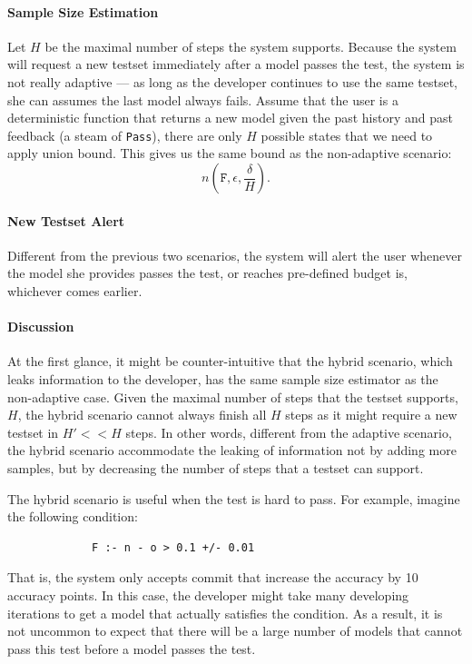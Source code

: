 \documentclass{article}
\begin{document}
\paragraph*{Sample Size Estimation}
Let $H$ be the maximal
number of steps the system supports.
Because the system will request a new testset
immediately after a model passes the test, the
system is not really adaptive --- as long as the 
developer continues to use the same testset, she
can assumes the last model always fails. Assume
that the user is a deterministic function that
returns a new model given the past history and 
past feedback (a steam of \texttt{Pass}), there are
only $H$ possible states that we need to apply
union bound. This gives us the same bound as 
the non-adaptive scenario:
\[
n(\texttt{F}, \epsilon, \frac{\delta}{H}).
\]

\paragraph*{New Testset Alert} Different from the
previous two scenarios, the system will alert
the user whenever the model she provides passes
the test, or reaches pre-defined budget is, whichever
comes earlier.

\paragraph*{Discussion} At the first glance, it 
might be counter-intuitive that the hybrid scenario,
which leaks information to the developer, has the
same sample size estimator as the non-adaptive case.
Given the maximal number of steps that the testset
supports, $H$, the hybrid scenario cannot always 
finish all $H$ steps as it might require a new testset
in $H' << H$ steps. In other words, different from
the adaptive scenario, the hybrid scenario accommodate
the leaking of information not by adding more samples,
but by decreasing the number of steps that a
testset can support. 

The hybrid scenario is useful when the test is hard to pass.
For example, imagine the following condition: 
\begin{verbatim}
             F :- n - o > 0.1 +/- 0.01
\end{verbatim}
That is, the system only accepts commit that increase the
accuracy by 10 accuracy points. In this case, the developer
might take many developing iterations to get a model
that actually satisfies the condition. As a result, it
is not uncommon to expect that there will be a 
large number of models that cannot pass this test 
before a model passes the test.
\end{document}
